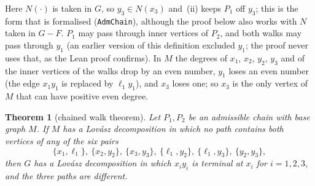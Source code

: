\documentclass[11pt]{amsart}
\newtheorem{theorem}{Theorem}[section]
\theoremstyle{definition}
\newcommand{\lean}[1]{\quad{\footnotesize[Lean: \texttt{#1}]}}
\begin{document}
Here $N(\cdot)$ is taken in $G$, so $y_3\in N(x_3)$ and~(ii) keeps $P_1$ off $y_3$; this is the
form that is formalised (\texttt{AdmChain}), although the proof below also works with $N$ taken
in $G-F$. $P_1$ may pass through inner vertices of $P_2$, and both walks may pass through $y_1$
(an earlier version of this definition excluded $y_1$; the proof never uses that, as the Lean
proof confirms). In $M$ the degrees of $x_1$, $x_2$, $y_2$, $y_3$ and of the inner
vertices of the walks drop by an even number, $y_1$ loses an even number (the edge $x_1y_1$ is
replaced by $\ell_1y_1$), and $x_3$ loses one; so $x_3$ is the only vertex of $M$ that can have positive even
degree.

\begin{theorem}[chained walk theorem]\label{thm:chain}
Let $P_1,P_2$ be an admissible chain with base graph $M$. If $M$ has a Lov\'asz decomposition in
which no path contains both vertices of any of the six pairs
\[
\{x_1,\ell_1\},\ \{x_2,y_2\},\ \{x_3,y_3\},\ \{\ell_1,y_2\},\ \{\ell_1,y_3\},\ \{y_2,y_3\},
\]
then $G$ has a Lov\'asz decomposition in which $x_iy_i$ is terminal at $x_i$ for $i=1,2,3$, and
the three paths are different.\lean{ptm3\_of\_base}
\end{theorem}
\end{document}
